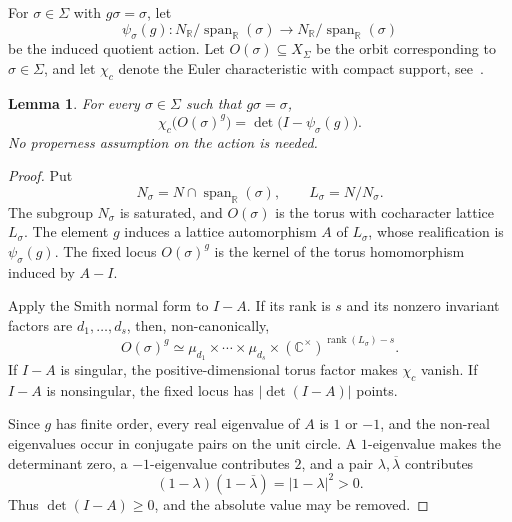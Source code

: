\documentclass[12pt]{amsart}
\newtheorem{lemma}[theorem]{Lemma}
\theoremstyle{remark}
\begin{document}
For $\sigma\in \Sigma$ with $g\sigma=\sigma$, let
\begin{equation*}
\psi_\sigma(g):N_\mathbb{R}/\operatorname{span}_\mathbb{R}(\sigma)
  \longrightarrow N_\mathbb{R}/\operatorname{span}_\mathbb{R}(\sigma)
\end{equation*}
be the induced quotient action. 
Let $O(\sigma)\subseteq X_\Sigma$ be the orbit corresponding to
$\sigma\in\Sigma$, and let $\chi_c$ denote the Euler characteristic with compact
support, see~\cite[Section 4.5]{Fulton}.

\begin{lemma}\label{lem:orbit-fixed}
For every $\sigma\in\Sigma$ such that $g\sigma=\sigma$,
\begin{equation*}
  \chi_c\bigl(O(\sigma)^g\bigr)
  =\det\bigl(I-\psi_\sigma(g)\bigr).
\end{equation*}
No properness assumption on the action is needed.
\end{lemma}

\begin{proof}
Put
\[
N_\sigma=N\cap\operatorname{span}_\mathbb{R}(\sigma),
  \qquad L_\sigma=N/N_\sigma.
\]
The subgroup $N_\sigma$ is saturated, and $O(\sigma)$ is the torus with
cocharacter lattice $L_\sigma$.  The element $g$ induces a lattice
automorphism $A$ of $L_\sigma$, whose realification is
$\psi_\sigma(g)$.  The fixed locus $O(\sigma)^g$ is the kernel of the torus
homomorphism induced by $A-I$.

Apply the Smith normal form to $I-A$.  If its rank is $s$ and its nonzero
invariant factors are $d_1,\ldots,d_s$, then, non-canonically,
\begin{equation*}
  O(\sigma)^g
  \simeq
  \mu_{d_1}\times\cdots\times\mu_{d_s}
  \times(\mathbb{C}^\times)^{\operatorname{rank}(L_\sigma)-s}.
\end{equation*}
If $I-A$ is singular, the positive-dimensional torus factor makes
$\chi_c$ vanish.  If $I-A$ is nonsingular, the fixed locus has
$|\det(I-A)|$ points.

Since $g$ has finite order, every real eigenvalue of $A$ is $1$ or $-1$,
and the non-real eigenvalues occur in conjugate pairs on the unit circle.  A
$1$-eigenvalue makes the determinant zero, a $-1$-eigenvalue contributes
$2$, and a pair $\lambda,\overline\lambda$ contributes
\[
  (1-\lambda)(1-\overline\lambda)=|1-\lambda|^2>0.
\]
Thus $\det(I-A)\geq0$, and the absolute value may be removed.
\end{proof}
\end{document}
